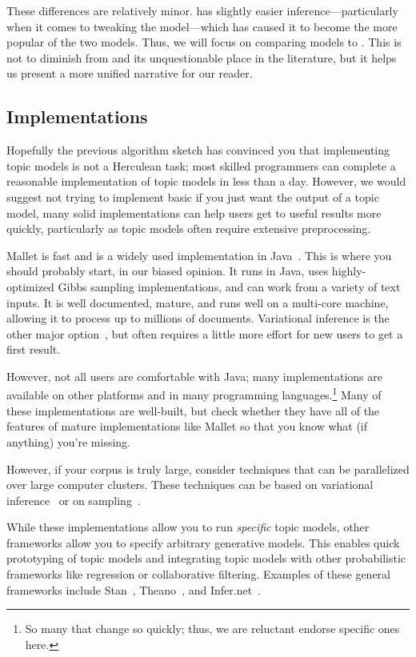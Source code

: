 These differences are relatively minor.   has slightly easier
inference---particularly when it comes to tweaking the model---which
has caused it to become the more popular of the two models.  Thus, we
will focus on comparing models to .  This is
not to diminish from \plsa{} and its unquestionable place in the
literature, but it helps us present a more unified narrative for our reader.

\subsection{Implementations}

Hopefully the previous algorithm sketch has convinced you that implementing
topic models is not a Herculean task; most skilled programmers can complete a
reasonable implementation of topic models in less than a day.  However, we would
suggest not trying to implement basic  if you just want the
output of a topic model, many solid
implementations can help users get to useful results more quickly, particularly
as topic models often require extensive preprocessing.

Mallet is fast and is a widely used implementation in Java~\citep{mallet}.  This
is where you should probably start, in our biased opinion.  It runs in Java, uses
highly-optimized Gibbs sampling implementations, and can work from a variety of
text inputs.  It is well documented, mature, and runs well on a multi-core
machine, allowing it to process up to millions of documents.  Variational
inference is the other major option~\citep{blei-03,vw}, but often requires a
little more effort for new users to get a first result.

However, not all users are comfortable with Java; many
implementations are available on other platforms and in many programming
languages.\footnote{So many that change so quickly; thus, we are reluctant endorse specific ones here.}  Many of these
implementations are well-built, but check
whether they have all of the features of mature implementations like
Mallet so that you know what (if anything) you're missing.

However, if your corpus is truly large, consider techniques that can be parallelized over large computer
clusters.  These techniques can be based on variational
inference~\citep{Narayanamurthy-11,zhai-12} or on
sampling~\citep{newman-08}.

While these implementations allow you to run \emph{specific} topic
models, other frameworks allow you to specify arbitrary generative
models.  This enables quick prototyping of topic models and
integrating topic models with other probabilistic frameworks like
regression or collaborative filtering.  Examples of these general
frameworks include Stan~\citep{stan-software:2014},
Theano~\citep{theano}, and Infer.net~\citep{InferNET14}.

